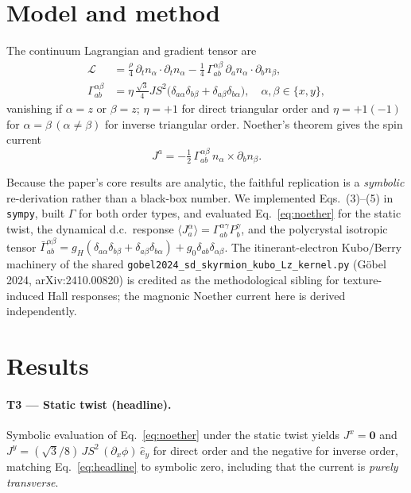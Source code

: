 \documentclass[twocolumn,aps,prl,superscriptaddress,nofootinbib]{revtex4-2}
\begin{document}
\section{Model and method}
The continuum Lagrangian and gradient tensor are
\begin{align}
\mathcal{L} &= \frac{\rho}{4}\,\partial_t n_\alpha\!\cdot\!\partial_t n_\alpha
 - \frac14\,\Gamma_{ab}^{\alpha\beta}\,\partial_a n_\alpha\!\cdot\!\partial_b n_\beta,\\
\Gamma_{ab}^{\alpha\beta} &= \eta\,\frac{\sqrt3}{4} J S^2
 \big(\delta_{a\alpha}\delta_{b\beta}+\delta_{a\beta}\delta_{b\alpha}\big),
 \quad \alpha,\beta\in\{x,y\},
\end{align}
vanishing if $\alpha=z$ or $\beta=z$; $\eta=+1$ for direct triangular order and
$\eta=+1(-1)$ for $\alpha=\beta\,(\alpha\neq\beta)$ for inverse triangular
order. Noether's theorem gives the spin current
\begin{equation}
J^a = -\tfrac12\,\Gamma_{ab}^{\alpha\beta}\, n_\alpha\times\partial_b n_\beta .
\label{eq:noether}
\end{equation}

Because the paper's core results are analytic, the faithful replication is a
\emph{symbolic} re-derivation rather than a black-box number. We implemented
Eqs.~(3)--(5) in \texttt{sympy}, built $\Gamma$ for both order types, and
evaluated Eq.~\eqref{eq:noether} for the static twist, the dynamical d.c.\
response $\langle J_a^\alpha\rangle=\Gamma_{ab}^{\alpha\gamma}P_b^\gamma$, and
the polycrystal isotropic tensor
$\bar\Gamma_{ab}^{\alpha\beta}=g_H(\delta_{a\alpha}\delta_{b\beta}
+\delta_{a\beta}\delta_{b\alpha})+g_0\delta_{ab}\delta_{\alpha\beta}$.
The itinerant-electron Kubo/Berry machinery of the shared
\texttt{gobel2024\_sd\_skyrmion\_kubo\_Lz\_kernel.py} (G\"obel 2024,
arXiv:2410.00820) is credited as the methodological sibling for
texture-induced Hall responses; the magnonic Noether current here is derived
independently.

\section{Results}
\paragraph{T3 --- Static twist (headline).}
Symbolic evaluation of Eq.~\eqref{eq:noether} under the static twist yields
$J^x=\mathbf{0}$ and $J^y = (\sqrt3/8)\,J S^2\,(\partial_x\phi)\,\hat e_y$ for
direct order and the negative for inverse order, matching
Eq.~\eqref{eq:headline} to symbolic zero, including that the current is
\emph{purely transverse}.
\end{document}

